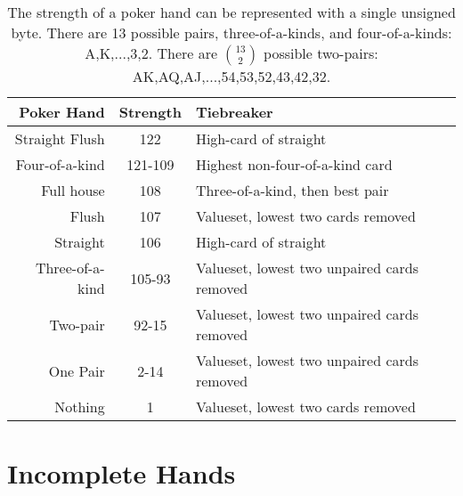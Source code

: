 \begin{table}[htb]
\captionsetup{position=top}
\caption[Hand Strength Byte]{The strength of a poker hand can be represented with a single unsigned byte.
There are 13 possible pairs, three-of-a-kinds, and four-of-a-kinds: A,K,...,3,2.
There are $\binom{13}{2}$ possible two-pairs: AK,AQ,AJ,...,54,53,52,43,42,32.}
\begin{small}
\begin{center}
\begin{tabular}{|r|c|l|}
\hline
Poker Hand      & Strength & Tiebreaker                                   \\ \hline
Straight Flush  & 122      & High-card of straight                        \\%
Four-of-a-kind  & 121-109  & Highest non-four-of-a-kind card              \\
Full house      & 108      & Three-of-a-kind, then best pair              \\
Flush           & 107      & Valueset, lowest two cards removed           \\
Straight        & 106      & High-card of straight                        \\
Three-of-a-kind & 105-93   & Valueset, lowest two unpaired cards removed  \\
Two-pair        & 92-15    & Valueset, lowest two unpaired cards removed  \\
One Pair        & 2-14     & Valueset, lowest two unpaired cards removed  \\
Nothing         & 1        & Valueset, lowest two cards removed           \\
\hline
\end{tabular}
\label{tab:StrengthByte}
\end{center}
\end{small}
\end{table}


\section{Incomplete Hands}
\label{sec:IncompleteHands}

